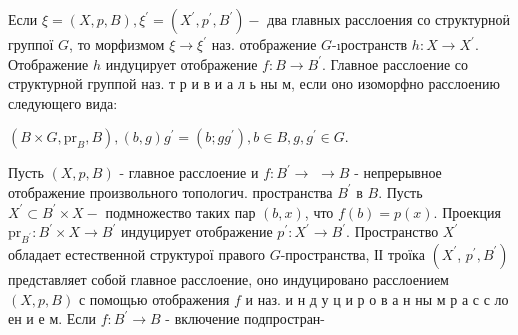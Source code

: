 \documentclass[10pt]{article}
\begin{document}
Если $\xi=(X, p, B), \xi^{\prime}=\left(X^{\prime}, p^{\prime}, B^{\prime}\right)-$ два главных расслоения со структурноӥ группої $G$, то морфизмом $\xi \rightarrow \xi^{\prime}$ наз. отображение $G$-ıространств $h: X \rightarrow X^{\prime}$. Отображение $h$ индуцирует отображение $f: B \rightarrow B^{\prime}$. Главное расслоение со структурной группой наз. т р и в и а л ь ны м, если оно изоморфно расслоению следующего вида:



$\left(B \times G, \mathrm{pr}_{B}, B\right),(b, g) g^{\prime}=\left(b ; g g^{\prime}\right), b \in B, g, g^{\prime} \in G$.



Пусть $(X, p, B)$ - главное расслоение и $f: B^{\prime} \rightarrow$ $\rightarrow B$ - непрерывное отображение произвольного топологич. пространства $B^{\prime}$ в $B$. Пусть $X^{\prime} \subset B^{\prime} \times X-$ подмножество таких пар $(b, x)$, что $f(b)=p(x)$. Проекция $\mathrm{pr}_{B^{\prime}}: B^{\prime} \times X \rightarrow B^{\prime}$ индуцирует отображение $p^{\prime}: X^{\prime} \rightarrow B^{\prime}$. Пространство $X^{\prime}$ обладает естественной структурої правого $G$-пространства, ІІ троїка $\left(X^{\prime}\right.$, $\left.p^{\prime}, B^{\prime}\right)$ представляет собой главное расслоение, оно индуцировано расслоением $(X, p, B)$ с помощью отображения $f$ и наз. и н д у ц и р о в а н ны м р а с с ло ен и е м. Если $f: B^{\prime} \rightarrow B$ - включение подпростран-
\end{document}
